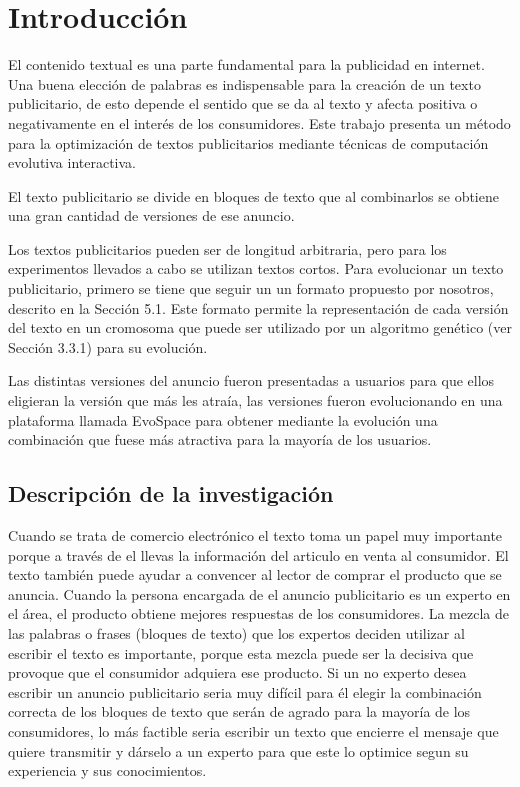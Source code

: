 
\chapter{Introducción}

El contenido textual es una parte fundamental para la publicidad en internet. Una buena elección de palabras es indispensable para la creación de un texto publicitario, de esto depende el sentido que se da al texto y afecta positiva o negativamente en el interés de los consumidores. Este trabajo presenta un método para la optimización de textos publicitarios mediante técnicas de computación evolutiva interactiva. 

El texto publicitario se divide en bloques de texto que al combinarlos se obtiene una gran cantidad de versiones de ese anuncio.

Los textos publicitarios pueden ser de longitud arbitraria, pero para los experimentos llevados a cabo se utilizan textos cortos. Para evolucionar un texto publicitario, primero se tiene que seguir un un formato propuesto por nosotros, descrito en la Sección 5.1. Este formato permite la representación de cada versión del texto en un cromosoma que puede ser utilizado por un algoritmo genético (ver Sección 3.3.1) para su evolución. 

Las distintas versiones del anuncio fueron presentadas a usuarios para que ellos eligieran la versión que más les atraía, las versiones fueron evolucionando en una plataforma llamada EvoSpace para obtener mediante la evolución una combinación que fuese más atractiva para la mayoría de los usuarios. 


\section{Descripción de la investigación}

Cuando se trata de comercio electrónico el texto toma un papel muy importante porque a través de el llevas la información del articulo en venta al consumidor. \cite{choi2002antecedents} El texto también puede ayudar a convencer al lector de comprar el producto que se anuncia. Cuando la persona encargada de el anuncio publicitario es un experto en el área, el producto obtiene mejores respuestas de los consumidores. La mezcla de las palabras o frases (bloques de texto) que los expertos deciden utilizar al escribir el texto es importante, porque esta mezcla puede ser la decisiva que provoque que el consumidor adquiera ese producto. Si un no experto desea escribir un anuncio publicitario seria muy difícil para él elegir la combinación correcta de los bloques de texto que serán de agrado para la mayoría de los consumidores, lo más factible seria escribir un texto que encierre el mensaje que quiere transmitir y dárselo a un experto para que este lo optimice segun su experiencia y sus conocimientos. 


